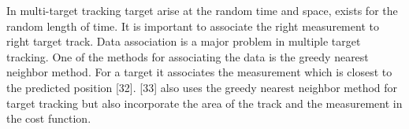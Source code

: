 In multi-target tracking target arise at the random time and space, exists for the random length of time. It is important to associate the right measurement to right target track. Data association is a major problem in multiple target tracking. One of the methods for associating the data is the greedy nearest neighbor method. For a target it associates the measurement which is closest to the predicted position [32]. [33] also uses the greedy nearest neighbor method for target tracking but also incorporate the area of the track and the measurement in the cost function.